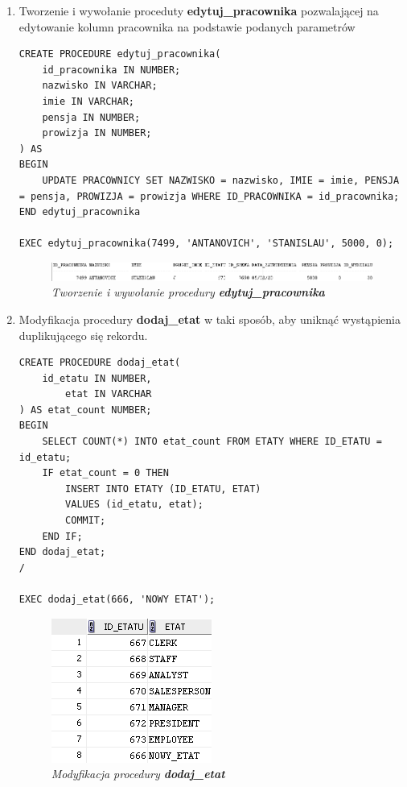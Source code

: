 \documentclass{article}
\begin{document}
\begin{enumerate}
\item Tworzenie i wywołanie proceduty \textbf{edytuj\_pracownika} pozwalającej na edytowanie kolumn pracownika na podstawie podanych parametrów

\begin{lstlisting}[style=SQL, caption=\textit{Tworzenie i wywołanie procedury \textbf{edytuj\_pracownika}}]
CREATE PROCEDURE edytuj_pracownika(
	id_pracownika IN NUMBER;
	nazwisko IN VARCHAR;
	imie IN VARCHAR;
	pensja IN NUMBER;
	prowizja IN NUMBER;
) AS
BEGIN
	UPDATE PRACOWNICY SET NAZWISKO = nazwisko, IMIE = imie, PENSJA = pensja, PROWIZJA = prowizja WHERE ID_PRACOWNIKA = id_pracownika;
END edytuj_pracownika

EXEC edytuj_pracownika(7499, 'ANTANOVICH', 'STANISLAU', 5000, 0);
\end{lstlisting}

		\begin{figure}[H]
			\centering
			\includegraphics{zadanie3.png}
			\caption{\textit{Tworzenie i wywołanie procedury \textbf{edytuj\_pracownika}}}
		\end{figure}

\item Modyfikacja procedury \textbf{dodaj\_etat} w taki sposób, aby uniknąć wystąpienia duplikującego się rekordu.

\begin{lstlisting}[style=SQL, caption=\textit{Modyfikacja procedury \textbf{dodaj\_etat}}]
CREATE PROCEDURE dodaj_etat(
	id_etatu IN NUMBER,
    	etat IN VARCHAR
) AS etat_count NUMBER;
BEGIN
	SELECT COUNT(*) INTO etat_count FROM ETATY WHERE ID_ETATU = id_etatu;
	IF etat_count = 0 THEN
		INSERT INTO ETATY (ID_ETATU, ETAT)
		VALUES (id_etatu, etat);
		COMMIT;
	END IF;
END dodaj_etat;
/

EXEC dodaj_etat(666, 'NOWY ETAT');
\end{lstlisting}

		\begin{figure}[H]
			\centering
			\includegraphics{zadanie4.png}
			\caption{\textit{Modyfikacja procedury \textbf{dodaj\_etat}}}
		\end{figure}


\end{enumerate}
\end{document}

